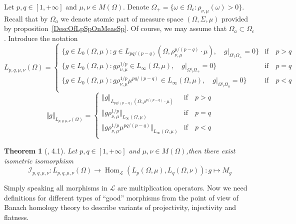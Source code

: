 \documentclass[12pt]{article}
\newtheorem{theorem}{Theorem}[subsection]
\begin{document}
Let $p,q\in[1,+\infty]$ and $\mu,\nu\in M(\Omega)$. Denote
$\Omega_+= \{\omega\in\Omega_c:\rho_{\nu,\mu}(\omega)>0 \}$. Recall that
by $\Omega_a$ we denote atomic part of measure space $(\Omega,\Sigma,\mu)$
provided by proposition~\ref{DescOfLpSpOnMeasSp}. Of course, we may assume
that $\Omega_a\subset\Omega_c$. Introduce the notation
$$
    L_{p,q,\mu,\nu}(\Omega)=
    \begin{cases}
        \{g\in L_0(\Omega,\mu):g\in
        L_{pq/(p-q)}(\Omega,\rho_{\nu,\mu}^{p/(p-q)}\cdot\mu),\quad
        g|_{\Omega\setminus\Omega_+}=0 \}                              &
        \text{if}\quad p>q                                               \\
        \{g\in L_0(\Omega,\mu):g\rho_{\nu,\mu}^{1/p}\in
        L_{\infty}(\Omega,\mu),\quad g|_{\Omega\setminus\Omega_+}=0 \} &
        \text{if}\quad p=q
        \\
        \{g\in L_0(\Omega,\mu):g\rho_{\nu,\mu}^{1/p}\mu^{pq/(p-q)}\in
        L_{\infty}(\Omega,\mu),\quad g|_{\Omega\setminus\Omega_a}=0 \} &
        \text{if}\quad p<q
        \\
    \end{cases}
$$
$$
    \Vert g\Vert_{L_{p,q,\mu,\nu}(\Omega)}=
    \begin{cases}
        \Vert g\Vert_{L_{pq/(p-q)}(\Omega,\rho^{p/(p-q)}\cdot\mu)} &
        \text{if}\quad p>q
        \\
        \Vert g\rho_{\nu,\mu}^{1/p}\Vert_{L_{\infty}(\Omega,\mu)}  &
        \text{if}\quad p=q
        \\
        \Vert g\rho_{\nu,\mu}^{1/p}\mu^{pq/(p-q)}\Vert_{L_{\infty}(\Omega,\mu)}
                                                                   &
        \text{if}\quad
        p<q                                                          \\
    \end{cases}
$$
\begin{theorem}[\cite{HelTensProdAndMultModLp}, 4.1]\label{LpModMorphCharac}
    Let $p,q\in[1,+\infty]$ and $\mu,\nu\in M(\Omega)$,then there exist
    isometric isomorphism
    $$
        \mathcal{I}_{p,q,\mu,\nu}:
        L_{p,q,\mu,\nu}(\Omega)
        \to\operatorname{Hom}_{\mathscr{L}}(L_p(\Omega,\mu),L_q(\Omega,\nu)):
        g\mapsto M_g
    $$
\end{theorem}

Simply speaking all morphisms in $\mathscr{L}$ are multiplication operators.
Now we need definitions for different types of ``good'' morphisms from the
point of view of Banach homology theory to describe variants of projectivity,
injectivity and flatness.
\end{document}
